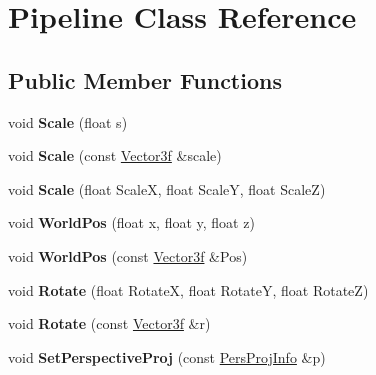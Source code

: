 \hypertarget{classPipeline}{\section{Pipeline Class Reference}
\label{classPipeline}
}
\subsection*{Public Member Functions}
\begin{DoxyCompactItemize}
\item 
\hypertarget{classPipeline_a387e21872c562a1281555f785176c702}{void {\bfseries Scale} (float s)}\label{classPipeline_a387e21872c562a1281555f785176c702}

\item 
\hypertarget{classPipeline_aa6639e2fe18c7edf3be890bed44bdbff}{void {\bfseries Scale} (const \hyperlink{structVector3f}{Vector3f} \&scale)}\label{classPipeline_aa6639e2fe18c7edf3be890bed44bdbff}

\item 
\hypertarget{classPipeline_aa60c3e22cce9d0368d3339d41996f328}{void {\bfseries Scale} (float Scale\-X, float Scale\-Y, float Scale\-Z)}\label{classPipeline_aa60c3e22cce9d0368d3339d41996f328}

\item 
\hypertarget{classPipeline_ac23d6a9d58cb5b3c56e536359a547f5c}{void {\bfseries World\-Pos} (float x, float y, float z)}\label{classPipeline_ac23d6a9d58cb5b3c56e536359a547f5c}

\item 
\hypertarget{classPipeline_a43ed451f986e4e2fb58360a787178dcb}{void {\bfseries World\-Pos} (const \hyperlink{structVector3f}{Vector3f} \&Pos)}\label{classPipeline_a43ed451f986e4e2fb58360a787178dcb}

\item 
\hypertarget{classPipeline_abc888ac10c51be6dbb0f1b6f8b3c4def}{void {\bfseries Rotate} (float Rotate\-X, float Rotate\-Y, float Rotate\-Z)}\label{classPipeline_abc888ac10c51be6dbb0f1b6f8b3c4def}

\item 
\hypertarget{classPipeline_a0f769bee11ed237587e381b8ef1d53d0}{void {\bfseries Rotate} (const \hyperlink{structVector3f}{Vector3f} \&r)}\label{classPipeline_a0f769bee11ed237587e381b8ef1d53d0}

\item 
\hypertarget{classPipeline_a01e87cbcd48fd0c7ac81f0701aeedb1d}{void {\bfseries Set\-Perspective\-Proj} (const \hyperlink{structPersProjInfo}{Pers\-Proj\-Info} \&p)}\label{classPipeline_a01e87cbcd48fd0c7ac81f0701aeedb1d}


\end{DoxyCompactItemize}
